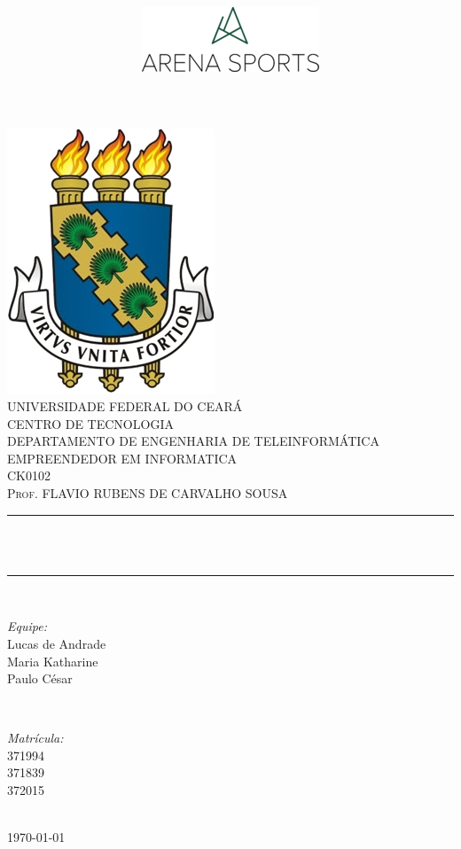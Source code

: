 \documentclass[a4paper]{article}
\title{ \includegraphics[scale=0.54]{logo.png}} %
\makeatletter
\let\thetitle\@title
\makeatother
\begin{document}
    \begin{titlepage}
    \centering
    \vspace*{0.5 cm}
        \includegraphics[scale = 0.6]{logo_ufc.png}\\[1.0 cm] %
        \textsc{\Large UNIVERSIDADE FEDERAL DO CEARÁ}\\[0.5 cm] %
        \textsc{CENTRO DE TECNOLOGIA}\\[0.5 cm]
        \textsc{DEPARTAMENTO DE ENGENHARIA DE TELEINFORMÁTICA}\\[1.5 cm]
        \textsc{EMPREENDEDOR EM INFORMATICA\\ \normalsize CK0102}\\[1.0 cm]  
      \textsc{Prof. FLAVIO RUBENS DE CARVALHO SOUSA }\\[0.5 cm] %
      \rule{\linewidth}{0.2 mm} \\[0.4 cm]
    { \huge \bfseries \thetitle}\\
    \rule{\linewidth}{0.2 mm} \\[0.5 cm]
    \begin{minipage}{0.4\textwidth}
    \begin{flushleft} \large
    \emph{Equipe:}\\
    \textnormal{Lucas de Andrade \\ Maria Katharine \\Paulo César}
    \end{flushleft}
    \end{minipage}~
    \begin{minipage}{0.4\textwidth}
    \begin{flushright} \large
    \emph{Matrícula:} \\
          371994 \\371839 \\372015               %
          \end{flushright}
          \end{minipage}\\[2 cm]
          
          {\large \today}\\[2 cm]
          
          \vfill
          
          \end{titlepage}
\end{document}
